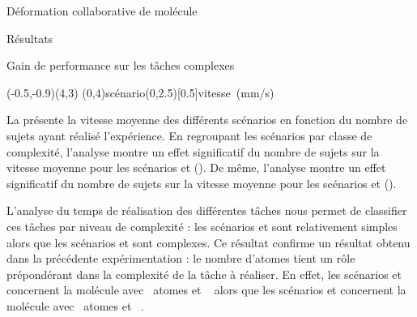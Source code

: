 \documentclass[myfrancais]{mythesis}
\begin{document}
\begin{mychapter}{Déformation collaborative de molécule}
\begin{mysection}{Résultats}
\begin{mysubsection}{Gain de performance sur les tâches complexes}
				\begin{myfigure}
					\begin{myps}(-0.5,-0.9)(4,3)
						\myaxes(0,4){scénario}(0,2.5)[0.5]{vitesse~(mm/s)}
					\end{myps}
				\end{myfigure}

				La  présente la vitesse moyenne  des différents scénarios  en fonction du nombre de sujets  ayant réalisé l'expérience.
				En regroupant les scénarios par classe de complexité, l'analyse montre un effet significatif du nombre de sujets  sur la vitesse moyenne  pour les scénarios  et  ().
				De même, l'analyse montre un effet significatif du nombre de sujets  sur la vitesse moyenne  pour les scénarios  et  ().

				L'analyse du temps de réalisation des différentes tâches nous permet de classifier ces tâches par niveau de complexité : les scénarios  et  sont relativement simples alors que les scénarios  et  sont complexes.
				Ce résultat confirme un résultat obtenu dans la précédente expérimentation  : le nombre d'atomes tient un rôle prépondérant dans la complexité de la tâche à réaliser.
				En effet, les scénarios  et  concernent la molécule \myTRPZIPPER avec ~atomes et ~ alors que les scénarios  et  concernent la molécule \myTRPZIPPER avec ~atomes et ~.


\end{mysubsection}
\end{mysection}
\end{mychapter}
\end{document}
